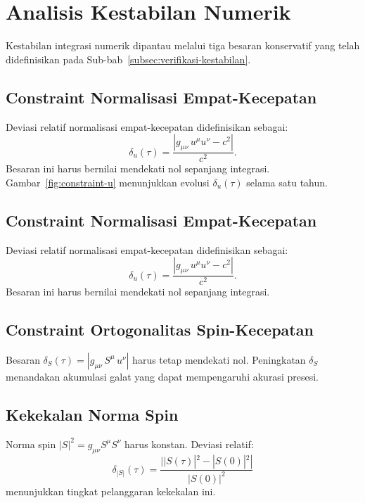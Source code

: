 \section{Analisis Kestabilan Numerik}
\label{sec:kestabilan}

Kestabilan integrasi numerik dipantau melalui tiga besaran konservatif
yang telah didefinisikan pada Sub-bab~\ref{subsec:verifikasi-kestabilan}.

\subsection{Constraint Normalisasi Empat-Kecepatan}

Deviasi relatif normalisasi empat-kecepatan didefinisikan sebagai:
\begin{equation}
    \delta_u(\tau) = \frac{|g_{\mu\nu}\,u^\mu u^\nu - c^2|}{c^2}.
    \label{eq:delta-u}
\end{equation}
Besaran ini harus bernilai mendekati nol sepanjang integrasi.
Gambar~\ref{fig:constraint-u} menunjukkan evolusi $\delta_u(\tau)$
selama satu tahun.

\subsection{Constraint Normalisasi Empat-Kecepatan}

Deviasi relatif normalisasi empat-kecepatan didefinisikan sebagai:
\begin{equation}
    \delta_u(\tau) = \frac{|g_{\mu\nu}\,u^\mu u^\nu - c^2|}{c^2}.
    \label{eq:delta-u}
\end{equation}
Besaran ini harus bernilai mendekati nol sepanjang integrasi.

\subsection{Constraint Ortogonalitas Spin-Kecepatan}

Besaran $\delta_S(\tau) = |g_{\mu\nu}\, S^\mu\, u^\nu|$
harus tetap mendekati nol. Peningkatan $\delta_S$ menandakan akumulasi galat
yang dapat mempengaruhi akurasi presesi.

\subsection{Kekekalan Norma Spin}

Norma spin $|S|^2 = g_{\mu\nu} S^\mu S^\nu$ harus konstan.
Deviasi relatif:
\begin{equation}
    \delta_{|S|}(\tau) = \frac{||S(\tau)|^2 - |S(0)|^2|}{|S(0)|^2}
    \label{eq:delta-norm-S}
\end{equation}
menunjukkan tingkat pelanggaran kekekalan ini.

